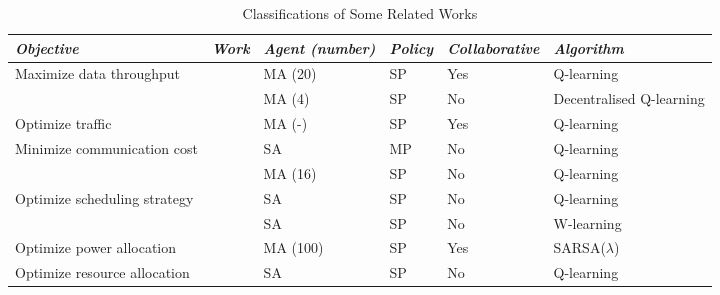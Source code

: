 \documentclass[journal]{IEEEtran}
\begin{document}
\begin{table*}
 \small
\centering
\caption{Classifications of Some Related Works}
\label{table:classification}
  \begin{tabular}{|l|lllll|}
  \hline
 \textit{Objective} & \textit{Work} & \textit{Agent (number)} & \textit{Policy} & \textit{Collaborative} & \textit{Algorithm}  \\
  \hline \hline
   Maximize data throughput %
                            &~\cite{Jadoon2017} & MA (20) & SP & Yes & Q-learning \\
                            &~\cite{Wilhelmi2017} & MA (4) & SP & No & Decentralised Q-learning \\ \hline
   Optimize traffic  %
                     &~\cite{Liu2017} &  MA (-) & SP & Yes & Q-learning\\ \hline
   Minimize communication cost%
                                &~\cite{Li2015}  & SA  & MP & No & Q-learning \\
                                &~\cite{Camelo2016} &  MA (16) & SP & No & Q-learning \\ \hline
   Optimize scheduling strategy &~\cite{Wen15} & SA & SP & No & Q-learning\\
                                &~\cite{Zhu2013} & SA  & SP & No & W-learning\\ \hline
   Optimize power allocation &~\cite{Khan2018} &  MA (100) & SP & Yes & SARSA($\lambda$)\\ \hline
   Optimize resource allocation &~\cite{Gai2018} & SA  & SP & No & Q-learning\\

      \hline \hline
 \end{tabular}
 \end{table*}
\end{document}
